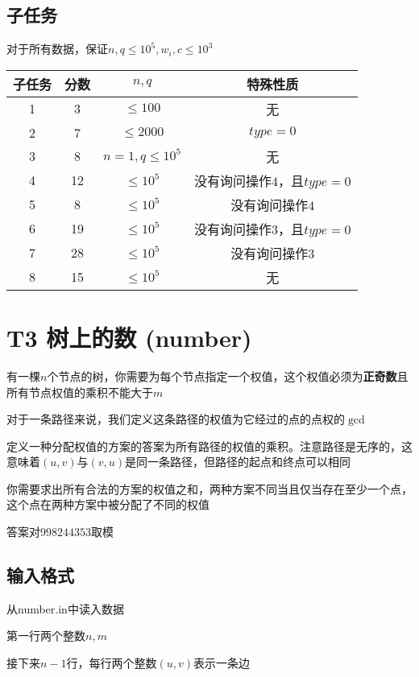 \documentclass[12pt]{article}
\begin{document}
	\subsection{子任务}
	对于所有数据，保证$n, q\leq 10^5, w_i, c\leq 10^3$\par
	\begin{table}[H]
		\centering
		\begin{tabular}{cccc}
			\toprule
			子任务 & 分数  & $n, q$ & 特殊性质\\
			\midrule
			1 & 3 & $\leq 100$ & 无 \\
			\midrule
			2 & 7 & $\leq 2000$ & $type = 0$ \\
			\midrule
			3 & 8 & $n = 1, q\leq 10^5$ & 无 \\
			\midrule
			4 & 12 & $\leq 10^5$ & 没有询问操作$4$，且$type = 0$\\
			\midrule
			5 & 8 & $\leq 10^5$ & 没有询问操作$4$\\
			\midrule
			6 & 19 & $\leq 10^5$ & 没有询问操作$3$，且$type = 0$\\
			\midrule
			7 & 28 & $\leq 10^5$ & 没有询问操作$3$\\
			\midrule
			8 & 15 & $\leq 10^5$ & 无\\
			\bottomrule
		\end{tabular}
	\end{table}  
	\newpage
	\section{T3 树上的数 (number)}
	有一棵$n$个节点的树，你需要为每个节点指定一个权值，这个权值必须为\textbf{正奇数}且所有节点权值的乘积不能大于$m$\par
	对于一条路径来说，我们定义这条路径的权值为它经过的点的点权的$\gcd$\par
	定义一种分配权值的方案的答案为所有路径的权值的乘积。注意路径是无序的，这意味着$(u, v)$与$(v, u)$是同一条路径，但路径的起点和终点可以相同\par
	你需要求出所有合法的方案的权值之和，两种方案不同当且仅当存在至少一个点，这个点在两种方案中被分配了不同的权值\par
	答案对$998244353$取模\par
	\subsection{输入格式}
	从number.in中读入数据\par
	第一行两个整数$n, m$\par
	接下来$n - 1$行，每行两个整数$(u, v)$表示一条边\par
\end{document}
